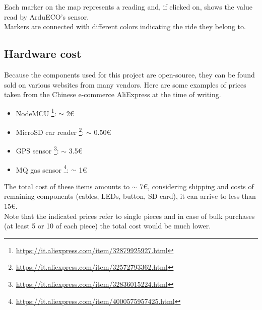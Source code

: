 \documentclass[conference]{IEEEtran}
\DeclareRobustCommand{\hlcyan}[1]{{\sethlcolor{cyan}\hl{#1}}}
\begin{document}
		Each marker on the map represents a reading and, if clicked on, shows the value read by ArduECO's sensor.\\
		Markers are connected with different colors indicating the ride they belong to.
		
	\subsection{Hardware cost}
	
		Because the components used for this project are open-source, they can be found sold on various websites from many vendors.
		Here are some examples of prices taken from the Chinese e-commerce AliExpress\cite{aliexpress} at the time of writing.
		\begin{itemize}
			\item NodeMCU \footnote{\url{https://it.aliexpress.com/item/32879925927.html}}: $ \sim $ 2\euro
			\item MicroSD car reader \footnote{\url{https://it.aliexpress.com/item/32572793362.html}}: $ \sim $ 0.50\euro
			\item GPS sensor \footnote{\url{https://it.aliexpress.com/item/32836015224.html}}: $ \sim $ 3.5\euro
			\item MQ gas sensor \footnote{\url{https://it.aliexpress.com/item/4000575957425.html}}: $ \sim $ 1\euro
		\end{itemize}
		The total cost of these items amounts to $\sim$ 7\euro, considering shipping and costs of remaining components (cables, LEDs, button, SD card), it can arrive to less than 15\euro.\\
		Note that the indicated prices refer to single pieces and in case of bulk purchases (at least 5 or 10 of each piece) the total cost would be much lower.
	
%
%
%	
\end{document}

